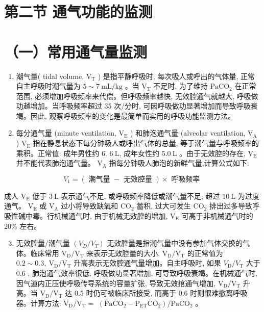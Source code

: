 \documentclass[10pt]{article}
\begin{document}
\section*{第二节 通气功能的监测}
\section*{（一）常用通气量监测}
\begin{enumerate}
  \item 潮气量( tidal volume, $\mathrm{V}_{\mathrm{T}}$ ) 是指平静呼吸时, 每次吸人或呼出的气体量, 正常自主呼吸时潮气量为 $5 \sim 7 \mathrm{~mL} / \mathrm{kg}$ 。当 $\mathrm{V}_{\mathrm{T}}$ 不足时, 为了维持 $\mathrm{PaCO}_{2}$ 在正常范围, 必须增加呼吸频率来代偿。但呼吸频率越快, 无效腔通气就越大, 呼吸做功越增加。当呼吸频率超过 35 次/分时, 可因呼吸做功显著增加而导致呼吸衰竭。因此, 观察呼吸频率的变化是最简单而实用的呼吸功能监测方法。

  \item 每分通气量 (minute ventilation, $\mathrm{V}_{\mathrm{E}}$ ) 和肺泡通气量 (alveolar ventilation, $\mathrm{V}_{\mathrm{A}}$ ) $\mathrm{V}_{\mathrm{E}}$ 指在静息状态下每分钟吸人或呼出气体的总量, 等于潮气量与呼吸频率的乘积。正常值: 成年男性约 6. $6 \mathrm{~L}$, 成年女性约 $5.0 \mathrm{~L}$ 。由于无效腔的存在, $\mathrm{V}_{\mathrm{E}}$ 并不能代表肺泡通气量。 $\mathrm{V}_{\mathrm{A}}$ 指每分钟吸人肺泡的新鲜气量,计算公式如下:

\end{enumerate}

\[
V_{1}=(\text { 潮气量 }- \text { 无效腔量 }) \times \text { 呼吸频率 }
\]

成人 $\mathrm{V}_{\mathrm{E}}$ 低于 $3 \mathrm{~L}$ 表示通气不足, 或呼吸频率降低或潮气量不足; 超过 $10 \mathrm{~L}$ 为过度通气。 $\mathrm{V}_{\mathrm{E}}$ 或 $\mathrm{V}_{\mathrm{A}}$ 过小将导致缺氧和 $\mathrm{CO}_{2}$ 蓄积, 过大可发生 $\mathrm{CO}_{2}$ 排出过多导致呼吸性碱中毒。行机械通气时, 由于机械无效腔的增加, $\mathrm{V}_{\mathrm{E}}$ 可高于非机械通气时的 $20 \%$ 左右。

\begin{enumerate}
  \setcounter{enumi}{2}
  \item 无效腔量/潮气量 $\left(V_{D} / V_{T}\right)$ 无效腔量是指潮气量中没有参加气体交换的气体。临床常用 $\mathrm{V}_{\mathrm{D}} / \mathrm{V}_{\mathrm{T}}$ 来表示无效腔量的大小, $\mathrm{V}_{\mathrm{D}} / \mathrm{V}_{\mathrm{T}}$ 的正常值为 $0.2 \sim 0.3, \mathrm{~V}_{\mathrm{D}} / \mathrm{V}_{\mathrm{T}}$ 升高表示无效腔通气量增加。自主呼吸时, 如果 $V_{\mathrm{D}} / V_{\mathrm{T}}$ 大于 0.6 , 肺泡通气效率很低, 呼吸做功显著增加, 可导致呼吸衰竭。在机械通气时, 因气道内正压使呼吸传导系统的容量扩张, 导致无效捾通气增加, $\mathrm{V}_{\mathrm{D}} / \mathrm{V}_{\mathrm{T}}$ 升高。当 $\mathrm{V}_{\mathrm{D}} / \mathrm{V}_{\mathrm{T}}$ 达 0.5 时仍可被临床所接受, 而高于 0.6 时则很难撤离呼吸器。计算方法: $\mathrm{V}_{\mathrm{D}} / \mathrm{V}_{\mathrm{T}}=$ $\left(\mathrm{PaCO}_{2}-\mathrm{P}_{\mathrm{ET}} \mathrm{CO}_{2}\right) / \mathrm{PaCO}_{2}$ 。
\end{enumerate}
\end{document}
